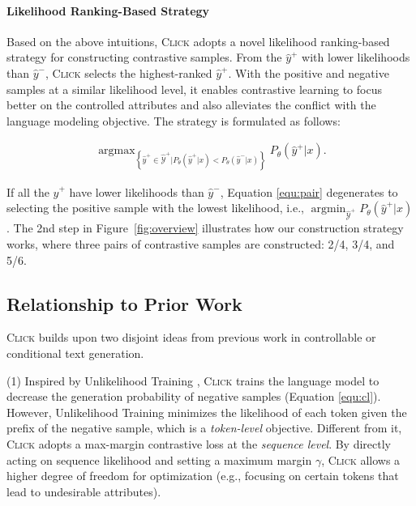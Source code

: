 \paragraph{Likelihood Ranking-Based Strategy} Based on the above intuitions, \textsc{Click} adopts a novel likelihood ranking-based strategy for constructing contrastive samples. From the $\hat{y}^{+}$ with lower likelihoods than $\hat{y}^{-}$, \textsc{Click} selects the highest-ranked $\hat{y}^{+}$.
With the positive and negative samples at a similar likelihood level, it enables contrastive learning to focus better on the controlled attributes and also alleviates the conflict with the language modeling objective. The strategy is formulated as follows:

\begin{align} \label{equ:pair}
    \mathop{\arg \max}_{ \left\{ \hat{y}^{+} \in \widehat{\mathcal{Y}}^{+} | P_{\theta} (\hat{y}^{+} | x) < P_{\theta} (\hat{y}^{-} | x) \right\}} P_{\theta} (\hat{y}^{+} | x).
\end{align}

If all the $\hat{y}^{+}$ have lower likelihoods than $\hat{y}^{-}$, Equation \ref{equ:pair} degenerates to selecting the positive sample with the lowest likelihood, i.e., $\mathop{\arg \min}_{\widehat{\mathcal{Y}}^{+}} P_{\theta} (\hat{y}^{+} | x)$. The 2nd step in Figure~\ref{fig:overview} illustrates how our construction strategy works, where three pairs of contrastive samples are constructed: \colorbox{negative}{2}/\colorbox{positive}{4}, \colorbox{negative}{3}/\colorbox{positive}{4}, and \colorbox{negative}{5}/\colorbox{positive}{6}.

\subsection{Relationship to Prior Work}
\label{subsec:prior}

\textsc{Click} builds upon two disjoint ideas from previous work in controllable or conditional text generation.

(1) Inspired by Unlikelihood Training \cite{unlikelihood}, \textsc{Click} trains the language model to decrease the generation probability of negative samples (Equation \ref{equ:cl}).
However, Unlikelihood Training minimizes the likelihood of each token given the prefix of the negative sample, which is a \textit{token-level} objective. Different from it, \textsc{Click} adopts a max-margin contrastive loss at the \textit{sequence level}. By directly acting on sequence likelihood and setting a maximum margin $\gamma$, \textsc{Click} allows a higher degree of freedom for optimization (e.g., focusing on certain tokens that lead to undesirable attributes).

